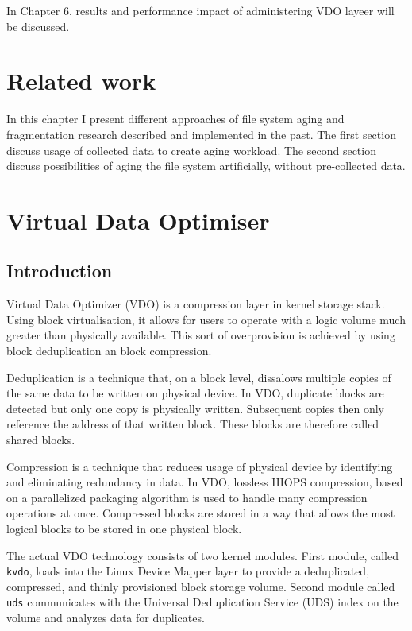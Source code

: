 \documentclass[
  color, %
  table, %
  lof,   %
  lot,   %
]{fithesis3}
\begin{document}
In Chapter 6, results and performance impact of administering VDO layeer will be discussed.





\chapter{Related work}
\label{related}
In this chapter I present different approaches of file system aging and fragmentation research described and implemented in the past. The first section discuss usage of collected data to create aging workload. The second section discuss possibilities of aging the file system artificially, without pre-collected data.




\chapter{Virtual Data Optimiser}
\label{VDO}
\section{Introduction}
Virtual Data Optimizer (VDO) is a compression layer in kernel storage stack. Using block virtualisation, it allows for users to operate with a logic volume much greater than physically available. This sort of overprovision is achieved by using block deduplication an block compression.

Deduplication is a technique that, on a block level, dissalows multiple copies of the same data to be written on physical device. In VDO, duplicate blocks are detected but only one copy is physically written. Subsequent copies then only reference the address of that written block. These blocks are therefore called shared blocks.

Compression is a technique that reduces usage of physical device by identifying and eliminating redundancy in data. In VDO, lossless HIOPS compression, based on a parallelized packaging algorithm is used to handle many compression operations at once. Compressed blocks are stored in a way that allows the most logical blocks to be stored in one physical block.

The actual VDO technology consists of two kernel modules. First module, called \texttt{kvdo}, loads into the Linux Device Mapper layer to provide a deduplicated, compressed, and thinly provisioned block storage volume. Second module called \texttt{uds} communicates with the Universal Deduplication Service (UDS) index on the volume and analyzes data for duplicates.
\end{document}
